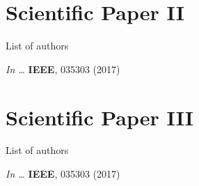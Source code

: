\cleardoublepage



\renewcommand{\boxsizept}{52pt}
\chapter{Scientific Paper II}
\thispagestyle{empty}

\noindent List of authors\vspace{3ex}

\noindent \textit{In \Proc \IntlConf \ldots} \textbf{IEEE}, 035303 (2017)
\cleardoublepage


\renewcommand{\boxsizept}{56pt}
\chapter{Scientific Paper III}
\thispagestyle{empty}

\noindent List of authors\vspace{3ex}

\noindent \textit{In \Proc \IntlConf \ldots} \textbf{IEEE}, 035303 (2017)
\cleardoublepage


\pagestyle{compiledpapers} %
%
\Blinddocument %
